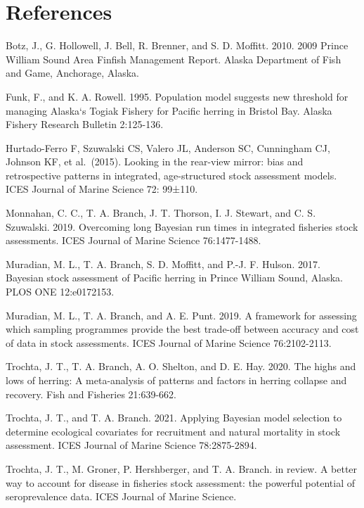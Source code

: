 \documentclass[
  11pt,
]{article}
\begin{document}
\newpage

\hypertarget{references}{%
\section{References}\label{references}}

Botz, J., G. Hollowell, J. Bell, R. Brenner, and S. D. Moffitt. 2010.
2009 Prince William Sound Area Finfish Management Report. Alaska
Department of Fish and Game, Anchorage, Alaska.

Funk, F., and K. A. Rowell. 1995. Population model suggests new
threshold for managing Alaska`s Togiak Fishery for Pacific herring in
Bristol Bay. Alaska Fishery Research Bulletin 2:125-136.

Hurtado-Ferro F, Szuwalski CS, Valero JL, Anderson SC, Cunningham CJ,
Johnson KF, et al.~(2015). Looking in the rear-view mirror: bias and
retrospective patterns in integrated, age-structured stock assessment
models. ICES Journal of Marine Science 72: 99±110.

Monnahan, C. C., T. A. Branch, J. T. Thorson, I. J. Stewart, and C. S.
Szuwalski. 2019. Overcoming long Bayesian run times in integrated
fisheries stock assessments. ICES Journal of Marine Science
76:1477-1488.

Muradian, M. L., T. A. Branch, S. D. Moffitt, and P.-J. F. Hulson. 2017.
Bayesian stock assessment of Pacific herring in Prince William Sound,
Alaska. PLOS ONE 12:e0172153.

Muradian, M. L., T. A. Branch, and A. E. Punt. 2019. A framework for
assessing which sampling programmes provide the best trade-off between
accuracy and cost of data in stock assessments. ICES Journal of Marine
Science 76:2102-2113.

Trochta, J. T., T. A. Branch, A. O. Shelton, and D. E. Hay. 2020. The
highs and lows of herring: A meta-analysis of patterns and factors in
herring collapse and recovery. Fish and Fisheries 21:639-662.

Trochta, J. T., and T. A. Branch. 2021. Applying Bayesian model
selection to determine ecological covariates for recruitment and natural
mortality in stock assessment. ICES Journal of Marine Science
78:2875-2894.

Trochta, J. T., M. Groner, P. Hershberger, and T. A. Branch. in review.
A better way to account for disease in fisheries stock assessment: the
powerful potential of seroprevalence data. ICES Journal of Marine
Science.
\end{document}
